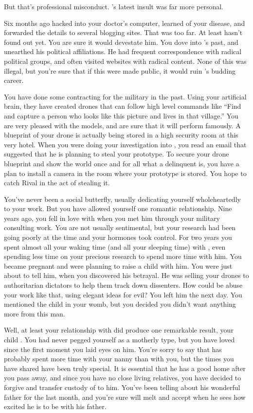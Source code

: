 \documentclass[char]{guildcamp1}
\begin{document}
But that's professional misconduct. \cRival{}'s latest insult was far more personal.

Six months ago \cRival{} hacked into your doctor's computer, learned of your disease, and forwarded the details to several blogging sites. That was too far. At least \cKid{} hasn't found out yet. You are sure it would devestate him. You dove into \cRival{}'s past, and unearthed his political affiliations. He had frequent correspondence with radical political groups, and often visited websites with radical content. None of this was illegal, but you're sure that if this were made public, it would ruin \cRival{}'s budding career.

You have done some contracting for the military in the past.  Using your artificial brain, they have created drones that can follow high level commands like ``Find and capture a person who looks like this picture and lives in that village.''  You are very pleased with the models, and are sure that it will perform famously.  A blueprint of your drone is actually being stored in a high security room at this very hotel.  When you were doing your investigation into \cRival{}, you read an email that suggested that he is planning to steal your prototype.  To secure your drone blueprint and show the world once and for all what a delinquent \cRival{} is, you have a plan to install a camera in the room where your prototype is stored.  You hope to catch Rival in the act of stealing it.

You've never been a social butterfly, usually dedicating yourself wholeheartedly to your work. But you have allowed yourself one romantic relationship.  Nine years ago, you fell in love with \cGroomA{\intro{}} when you met him through your military consulting work.  You are not usually sentimental, but your research had been going poorly at the time and your hormones took control. For two years you spent almost all your waking time (and all your sleeping time) with \cGroomA{}, even spending less time on your precious research to spend more time with him.  You became pregnant and were planning to raise a child with him. You were just about to tell him, when you discovered his betrayal.  He was selling your drones to authoritarian dictators to help them track down dissenters.  How could be abuse your work like that, using elegant ideas for evil?  You left him the next day.  You mentioned the child in your womb, but you decided you didn't want anything more from this man.
 
Well, at least your relationship with \cGroomA{} did produce one remarkable result, your child \cKid{}. You had never pegged yourself as a motherly type, but you have loved \cKid{} since the first moment you laid eyes on him.  You're sorry to say that \cKid{} has probably spent more time with your nanny than with you, but the times you have shared have been truly special.  It is essential that he has a good home after you pass away, and since you have no close living relatives, you have decided to forgive \cGroomA{} and transfer custody of \cKid{} to him.  You've been telling \cKid{} about his wonderful father for the last month, and you're sure \cGroomA{} will melt and accept \cKid{} when he sees how excited he is to be with his father.
\end{document}
